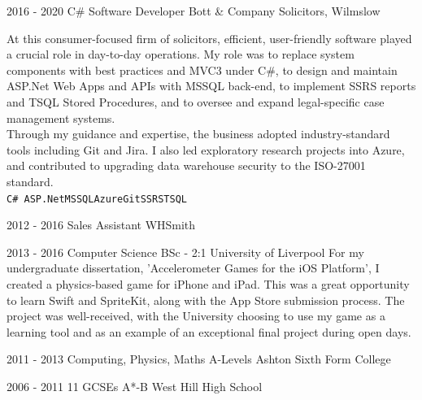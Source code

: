 \documentclass[8pt]{developercv} %
\begin{document}
\begin{entrylist}
\vspace{0.6cm}
    \entry
		{2016 - 2020}
		{C\# Software Developer}
		{Bott \& Company Solicitors, Wilmslow}
		{\raggedright At this consumer-focused firm of solicitors, efficient, user-friendly software played a crucial role in day-to-day operations. My role was to replace system components with best practices and MVC3 under C\#, to design and maintain ASP.Net Web Apps and APIs with MSSQL back-end, to implement SSRS reports and TSQL Stored Procedures, and to oversee and expand legal-specific case management systems.\\\vspace{0.1cm}Through my guidance and expertise, the business adopted industry-standard tools including Git and Jira. I also led exploratory research projects into Azure, and contributed to upgrading data warehouse security to the ISO-27001 standard.\\\vspace{0.1cm}\texttt{C\# ASP.Net}\slashsep\texttt{MSSQL}\slashsep\texttt{Azure}\slashsep\texttt{Git}\slashsep\texttt{SSRS}\slashsep\texttt{TSQL}}

\vspace{0.6cm}
    \entry
		{2012 - 2016}
		{Sales Assistant}
		{WHSmith}
		{\raggedright }
\end{entrylist}



\begin{entrylist}
    \entry
		{}
		{}
		{}
		{\vspace{-0.5cm}}

\vspace{0.6cm}
	\entry
		{2013 - 2016}
		{Computer Science BSc - 2:1}
		{University of Liverpool}
		{For my undergraduate dissertation, 'Accelerometer Games for the iOS Platform', I created a physics-based game for iPhone and iPad. This was a great opportunity to learn Swift and SpriteKit, along with the App Store submission process. The project was well-received, with the University choosing to use my game as a learning tool and as an example of an exceptional final project during open days.}

\vspace{0.6cm}
	\entry
		{2011 - 2013}
		{Computing, Physics, Maths A-Levels}
		{Ashton Sixth Form College}
		{}

\vspace{0.6cm}
	\entry
		{2006 - 2011}
		{11 GCSEs A*-B}
		{West Hill High School}
		{}
\end{entrylist}
\end{document}

